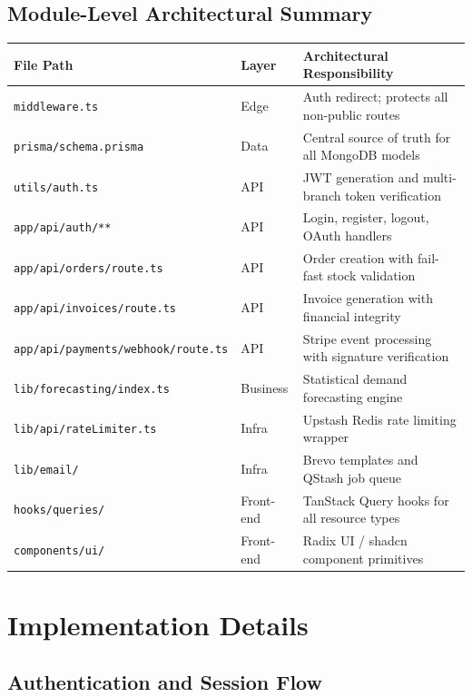 \documentclass[12pt,a4paper]{report}
\begin{document}
\section{Module-Level Architectural Summary}

\begin{tabularx}{\textwidth}{l l X}
    \toprule
    \textbf{File Path} & \textbf{Layer} & \textbf{Architectural Responsibility} \\
    \midrule
    \texttt{middleware.ts} & Edge & Auth redirect; protects all non-public routes \\
    \texttt{prisma/schema.prisma} & Data & Central source of truth for all MongoDB models \\
    \texttt{utils/auth.ts} & API & JWT generation and multi-branch token verification \\
    \texttt{app/api/auth/**} & API & Login, register, logout, OAuth handlers \\
    \texttt{app/api/orders/route.ts} & API & Order creation with fail-fast stock validation \\
    \texttt{app/api/invoices/route.ts} & API & Invoice generation with financial integrity \\
    \texttt{app/api/payments/webhook/route.ts} & API & Stripe event processing with signature verification \\
    \texttt{lib/forecasting/index.ts} & Business & Statistical demand forecasting engine \\
    \texttt{lib/api/rateLimiter.ts} & Infra & Upstash Redis rate limiting wrapper \\
    \texttt{lib/email/} & Infra & Brevo templates and QStash job queue \\
    \texttt{hooks/queries/} & Front-end & TanStack Query hooks for all resource types \\
    \texttt{components/ui/} & Front-end & Radix UI / shadcn component primitives \\
    \bottomrule
\end{tabularx}

\chapter{Implementation Details}

\section{Authentication and Session Flow}
\end{document}
